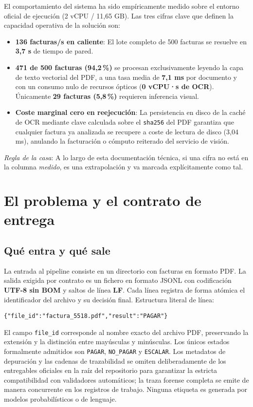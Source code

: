 \documentclass[11pt,a4paper]{article}
\begin{document}
El comportamiento del sistema ha sido empíricamente medido sobre el entorno oficial de ejecución (2 vCPU / 11,65 GB). Las tres cifras clave que definen la capacidad operativa de la solución son:
\begin{itemize}
    \item \textbf{136 facturas/s en caliente}: El lote completo de 500 facturas se resuelve en \textbf{3,7 s} de tiempo de pared.
    \item \textbf{471 de 500 facturas (94,2\,\%)} se procesan exclusivamente leyendo la capa de texto vectorial del PDF, a una tasa media de \textbf{7,1 ms} por documento y con un consumo nulo de recursos ópticos (\textbf{0 vCPU·s de OCR}). Únicamente \textbf{29 facturas (5,8\,\%)} requieren inferencia visual.
    \item \textbf{Coste marginal cero en reejecución}: La persistencia en disco de la caché de OCR mediante clave calculada sobre el \texttt{sha256} del PDF garantiza que cualquier factura ya analizada se recupere a coste de lectura de disco (3,04 ms), anulando la facturación o cómputo reiterado del servicio de visión.
\end{itemize}

\textit{Regla de la casa}: A lo largo de esta documentación técnica, si una cifra no está en la columna \textit{medido}, es una extrapolación y va marcada explícitamente como tal.

\section{El problema y el contrato de entrega}

\subsection{Qué entra y qué sale}
La entrada al pipeline consiste en un directorio con facturas en formato PDF. La salida exigida por contrato es un fichero en formato JSONL con codificación \textbf{UTF-8 sin BOM} y saltos de línea \textbf{LF}. Cada línea registra de forma atómica el identificador del archivo y su decisión final. Estructura literal de línea:
\begin{lstlisting}[basicstyle=\ttfamily\small]
{"file_id":"factura_5518.pdf","result":"PAGAR"}
\end{lstlisting}
El campo \texttt{file\_id} corresponde al nombre exacto del archivo PDF, preservando la extensión y la distinción entre mayúsculas y minúsculas. Los únicos estados formalmente admitidos son \texttt{PAGAR}, \texttt{NO\_PAGAR} y \texttt{ESCALAR}. Los metadatos de depuración y las cadenas de trazabilidad se omiten deliberadamente de los entregables oficiales en la raíz del repositorio para garantizar la estricta compatibilidad con validadores automáticos; la traza forense completa se emite de manera concurrente en los registros de trabajo. Ninguna etiqueta es generada por modelos probabilísticos o de lenguaje.
\end{document}
